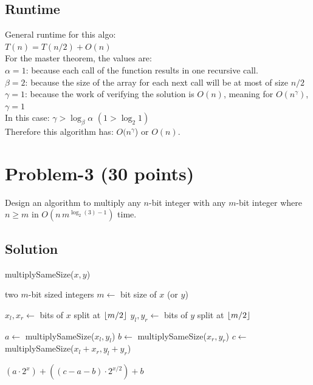 \documentclass[11pt]{article}
\DeclarePairedDelimiter{\floor}{\lfloor}{\rfloor}
\begin{document}
\subsection*{Runtime}
General runtime for this algo:\\
$T(n) = T(n/2) + O(n)$\\

\noindent For the master theorem, the values are:\\
\noindent $\alpha=1$: because each call of the function results in one recursive call.\\
$\beta=2$: because the size of the array for each next call will be at most of size $n/2$\\
$\gamma=1$: because the work of verifying the solution is $O(n)$, meaning for $O(n^\gamma)$, $\gamma = 1$\\

\noindent In this case: $\gamma > \log_\beta \alpha$ $(1 > \log_2 1)$\\
Therefore this algorithm has: $O(n^\gamma$) or $O(n)$.

\newpage
\section*{Problem-3 (30 points)}
Design an algorithm to multiply any $n$-bit integer with any $m$-bit integer where $n \ge m$ in $O(n\, m^{\log_2(3) - 1})$ time.
 

\subsection*{Solution}

\begin{algorithm}
\caption{multiplySameSize($x, y$)}
\begin{algorithmic} 
\REQUIRE two $m$-bit sized integers
\smallskip
\STATE $m \leftarrow$ bit size of $x$ (or $y$)

\smallskip
\STATE $x_l, x_r \leftarrow$ bits of $x$ split at $\floor{m/2}$
\STATE $y_l, y_r \leftarrow$ bits of $y$ split at $\floor{m/2}$

\smallskip
\STATE $a \leftarrow$ multiplySameSize($x_l, y_l$)
\STATE $b \leftarrow$ multiplySameSize($x_r, y_r$)
\STATE $c \leftarrow$ multiplySameSize($x_l + x_r, y_l + y_r$)

\smallskip
\RETURN $(a \cdot 2^x) + ((c-a-b) \cdot 2^{x/2}) + b$

\end{algorithmic}
\end{algorithm}
\end{document}
